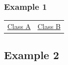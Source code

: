 \documentclass[xcolor=svgnames, compress]{beamer}
\begin{document}

\begin{frame}[t]
\frametitle{Example 1} 

\hspace*{0.5cm}
\begin{tabular}{ C{3.75cm}  C{3.75cm} }
\hspace{2.25cm} \underline{Class A} & \hspace{2cm} \underline{Class B}
\end{tabular}

\end{frame}




\subsection*{Example 2}
\end{document}
